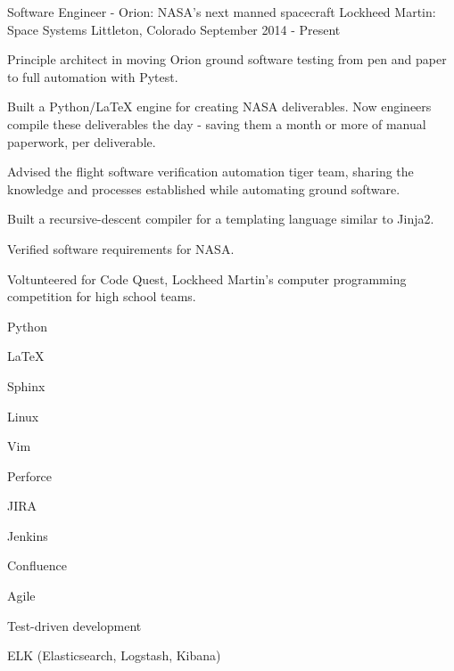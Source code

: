 

\begin{cventries}

  \cventry
    {Software Engineer - Orion: NASA's next manned spacecraft} %
    {Lockheed Martin: Space Systems} %
    {Littleton, Colorado} %
    {September 2014 - Present} %
    {%
      \begin{cvitems} %
        \item {Principle architect in moving Orion ground software testing from pen and paper to full automation with Pytest.}
        \item {Built a Python/LaTeX engine for creating NASA deliverables.  Now engineers compile these deliverables the day - saving them a month or more of manual paperwork, per deliverable.}
        \item {Advised the flight software verification automation tiger team, sharing the knowledge and processes established while automating ground software.}
        \item {Built a recursive-descent compiler for a templating language similar to Jinja2.}
        \item {Verified software requirements for NASA.}
        \item {Voltunteered for Code Quest, Lockheed Martin's computer programming competition for high school teams.}
      \end{cvitems}
    }
    \begin{cventryskills}
      \item Python
      \item LaTeX
      \item Sphinx
      \item Linux
      \item Vim
      \item Perforce
      \item JIRA
      \item Jenkins
      \item Confluence
      \item Agile
      \item Test-driven development
      \item ELK (Elasticsearch, Logstash, Kibana)
    \end{cventryskills}


\end{cventries}
